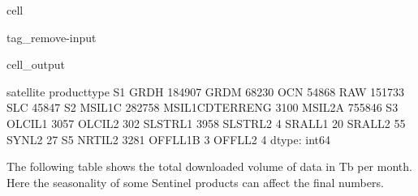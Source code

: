 \documentclass[letterpaper,10pt,english]{jupyterBook}
\begin{document}
\begin{sphinxuseclass}{cell}
\begin{sphinxuseclass}{tag_remove-input}\begin{sphinxVerbatimOutput}

\begin{sphinxuseclass}{cell_output}
\begin{sphinxVerbatim}[commandchars=\\\{\}]
satellite  product\PYGZus{}type   
S1         GRDH               184907
           GRDM                68230
           OCN                 54868
           RAW                151733
           SLC                 45847
S2         MSIL1C             282758
           MSIL1C\PYGZus{}DTERRENG      3100
           MSIL2A             755846
S3         OLCI\PYGZus{}L1              3057
           OLCI\PYGZus{}L2               302
           SLSTR\PYGZus{}L1             3958
           SLSTR\PYGZus{}L2                4
           SRAL\PYGZus{}L1                20
           SRAL\PYGZus{}L2                55
           SYN\PYGZus{}L2                 27
S5         NRTI\PYGZus{}L2              3281
           OFFL\PYGZus{}L1B                3
           OFFL\PYGZus{}L2                 4
dtype: int64
\end{sphinxVerbatim}

\end{sphinxuseclass}\end{sphinxVerbatimOutput}

\end{sphinxuseclass}
\end{sphinxuseclass}
\sphinxAtStartPar
The following table shows the total downloaded volume of data in Tb per month. Here the seasonality of some Sentinel products can affect the final numbers.
\end{document}
